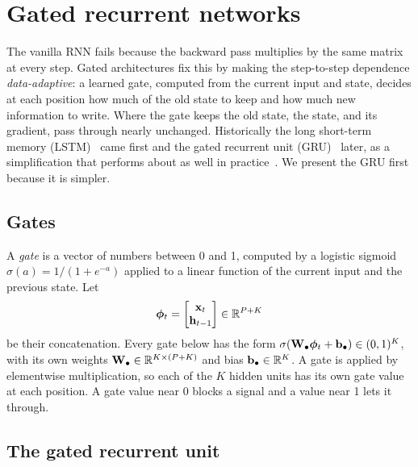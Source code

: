 \section{Gated recurrent networks}
\label{sec:gated}

The vanilla RNN fails because the backward pass multiplies by the same matrix at every step. Gated architectures fix this by making the step-to-step dependence \emph{data-adaptive}: a learned gate, computed from the current input and state, decides at each position how much of the old state to keep and how much new information to write. Where the gate keeps the old state, the state, and its gradient, pass through nearly unchanged. Historically the long short-term memory (LSTM)~\citep{hochreiter1997lstm} came first and the gated recurrent unit (GRU)~\citep{cho2014} later, as a simplification that performs about as well in practice~\citep{chung2014,jozefowicz2015}. We present the GRU first because it is simpler.

\subsection{Gates}

A \emph{gate} is a vector of numbers between 0 and 1, computed by a logistic sigmoid $\sigma(a)=1/(1+e^{-a})$ applied to a linear function of the current input and the previous state. Let
\begin{equation}
  \boldsymbol{\phi}_t = \begin{bmatrix}\mathbf{x}_t\\\mathbf{h}_{t-1}\end{bmatrix}\in\mathbb{R}^{P+K}
\end{equation}
be their concatenation. Every gate below has the form $\sigma(\mathbf{W}_\bullet\boldsymbol{\phi}_t+\mathbf{b}_\bullet)\in(0,1)^K$, with its own weights $\mathbf{W}_\bullet\in\mathbb{R}^{K\times(P+K)}$ and bias $\mathbf{b}_\bullet\in\mathbb{R}^K$. A gate is applied by elementwise multiplication, so each of the $K$ hidden units has its own gate value at each position. A gate value near 0 blocks a signal and a value near 1 lets it through.

\subsection{The gated recurrent unit}

